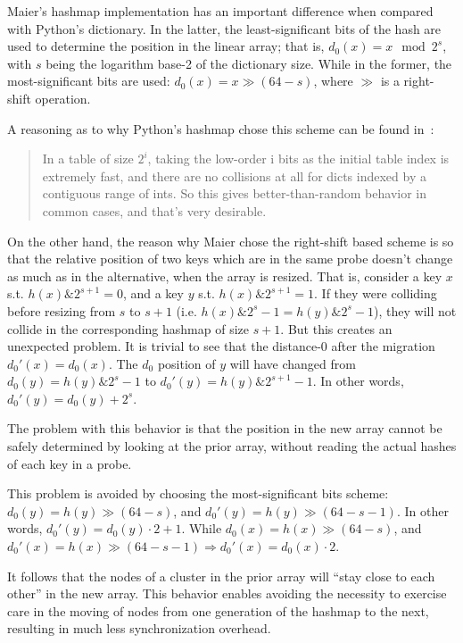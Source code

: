 Maier's hashmap implementation has an important difference when compared with Python's dictionary.
In the latter, the least-significant bits of the hash are used to determine the position in the linear array; that is, $d_0(x) = x \mod 2^s$, with $s$ being the logarithm base-2 of the dictionary size.
While in the former, the most-significant bits are used: $d_0(x) = x \gg (64 - s)$, where $\gg$ is a right-shift operation.

A reasoning as to why Python's hashmap chose this scheme can be found in~\cite{dict-comment-hash}:
\begin{quote}
	In a table of size $2^i$, taking the low-order i bits as the initial table index is extremely fast, and there
	are no collisions at all for dicts indexed by a contiguous range of ints.
	So this gives better-than-random behavior in common cases, and that's very desirable.
\end{quote}
On the other hand, the reason why Maier chose the right-shift based scheme is so that the relative position of two keys which are in the same probe doesn't change as much as in the alternative, when the array is resized.
That is, consider a key $x$ s.t. $h(x) \mathbin{\&} 2^{s + 1} = 0$, and a key $y$ s.t. $h(x) \mathbin{\&} 2^{s + 1} = 1$.
If they were colliding before resizing from $s$ to $s + 1$ (i.e. $h(x) \mathbin{\&} 2^s - 1 = h(y) \mathbin{\&} 2^s - 1$), they will not collide in the corresponding hashmap of size $s + 1$.
But this creates an unexpected problem.
It is trivial to see that the distance-0 after the migration $d_0'(x) = d_0(x)$.
The $d_0$ position of $y$ will have changed from $d_0(y) = h(y) \mathbin{\&} 2^s-1$ to $d_0'(y) = h(y) \mathbin{\&} 2^{s+1}-1$.
In other words, $d_0'(y) = d_0(y) + 2^s$.

The problem with this behavior is that the position in the new array cannot be safely determined by looking at the prior array, without reading the actual hashes of each key in a probe.

This problem is avoided by choosing the most-significant bits scheme: $d_0(y) = h(y) \gg (64 - s)$, and $d_0'(y) = h(y) \gg (64 - s - 1)$.
In other words, $d_0'(y) = d_0(y) \cdot 2 + 1$.
While $d_0(x) = h(x) \gg (64 - s)$, and $d_0'(x) = h(x) \gg (64 - s - 1) \Rightarrow d_0'(x) = d_0(x) \cdot 2$.

It follows that the nodes of a cluster in the prior array will ``stay close to each other'' in the new array.
This behavior enables avoiding the necessity to exercise care in the moving of nodes from one generation of the hashmap to the next, resulting in much less synchronization overhead.

